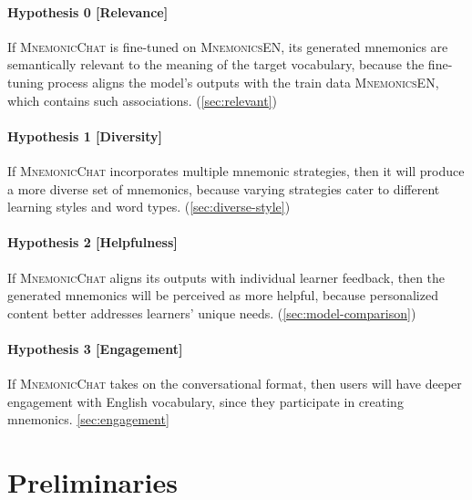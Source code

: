 \documentclass{article}
\newcounter{para}
\begin{document}

\paragraph{Hypothesis 0 [Relevance]} If \textsc{MnemonicChat} is fine-tuned on \textsc{MnemonicsEN}, its generated mnemonics are semantically relevant to the meaning of the target vocabulary, because the fine-tuning process aligns the model's outputs with the train data \textsc{MnemonicsEN}, which contains such associations. (\ref{sec:relevant})

\paragraph{Hypothesis 1 [Diversity]} If \textsc{MnemonicChat} incorporates multiple mnemonic strategies, then it will produce a more diverse set of mnemonics, because varying strategies cater to different learning styles and word types. (\ref{sec:diverse-style})
\paragraph{Hypothesis 2 [Helpfulness]} If \textsc{MnemonicChat} aligns its outputs with individual learner feedback, then the generated mnemonics will be perceived as more helpful, because personalized content better addresses learners' unique needs. (\ref{sec:model-comparison})

\paragraph{Hypothesis 3 [Engagement]} If \textsc{MnemonicChat} takes on the conversational format, then users will have deeper engagement with English vocabulary, since they participate in creating mnemonics. \ref{sec:engagement}

\section{Preliminaries}
\end{document}
